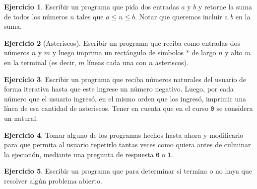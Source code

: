 \documentclass[a4paper,12pt]{book}
\theoremstyle{definition}
\newtheorem{ejercicio}{Ejercicio}
\begin{document}
	\begin{ejercicio}
		Escribir un programa que pida dos entradas $a$ y $b$ y retorne la suma de todos los números $n$ tales que $a\leq n\leq b$. Notar que queremos incluir a $b$ en la suma.
	\end{ejercicio}
	\begin{ejercicio}[Asteriscos]
		Escribir un programa que reciba como entradas dos números $n$ y $m$ y luego imprima un rectángulo de símbolos * de largo $n$ y alto $m$ en la terminal (es decir, $m$ líneas cada una con $n$ asteriscos).
	\end{ejercicio}
	\begin{ejercicio}
		Escribir un programa que reciba números naturales del usuario de forma iterativa hasta que este ingrese un número negativo. Luego, por cada número que el usuario ingresó, en el mismo orden que los ingresó, imprimir una línea de esa cantidad de asteriscos. Tener en cuenta que en el curso {\tt 0} se considera un natural.
	\end{ejercicio}
	\begin{ejercicio}
		Tomar alguno de los programas hechos hasta ahora y modificarlo para que permita al usuario repetirlo tantas veces como quiera antes de culminar la ejecución, mediante una pregunta de respuesta {\tt 0} o {\tt 1}.
	\end{ejercicio}
	\begin{ejercicio}
		Escribir un programa que para determinar si termina o no haya que resolver algún problema abierto.
	\end{ejercicio}
	
\end{document}
